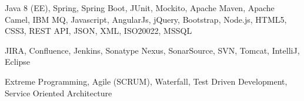 \medskip
\begin{description}
	\ifincludestech
	\item [Technologies:] Java 8 (EE), Spring, Spring Boot, JUnit, Mockito, Apache Maven, Apache Camel, IBM MQ, Javascript, AngularJs, jQuery, Bootstrap, Node.js, HTML5, CSS3, REST API, JSON, XML, ISO20022, MSSQL
	\fi
	\ifincludestools
	\item [Tools:] JIRA, Confluence, Jenkins, Sonatype Nexus, SonarSource, SVN, Tomcat, IntelliJ, Eclipse
	\fi
	\ifincludesmethods
	\item [Methodologies:] Extreme Programming, Agile (SCRUM), Waterfall, Test Driven Development, Service Oriented Architecture
	\fi
\end{description}
